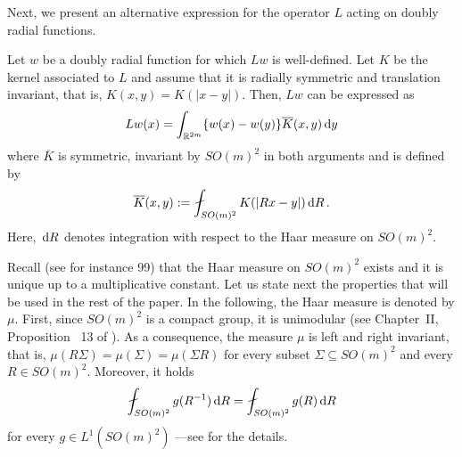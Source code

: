 Next, we present an alternative expression for the operator $L$ acting on doubly radial functions.

\begin{lemma} \label{Lemma:AlternativeOperatorExpression}
Let $w$ be a doubly radial function for which $Lw$ is well-defined. Let $K$ be the kernel
associated to $L$ and assume that it is radially symmetric and translation invariant, that is,
$K(x,y) = K(|x-y|)$. Then, $Lw$ can be expressed as
$$
Lw(x) = \int_{\mathbb{R}^{2m}} \{w(x) - w(y)\} \overline{K}(x,y) \,\mathrm{d} y
$$
where $\overline{K}$ is symmetric, invariant by $SO(m)^2$ in both arguments and is defined by
\begin{equation}
\label{Eq:KbarDef}
\overline{K}(x,y) := \average_{SO(m)^2} K(|Rx - y|)\d R\,.
\end{equation}
Here, $\,\mathrm{d} R$ denotes integration with respect to the Haar measure on $SO(m)^2$.
\end{lemma}

Recall (see for instance 99) that the Haar measure on $SO(m)^2$ exists and it is unique up to a
multiplicative constant. Let us state next the properties that will be used in the rest of the
paper. In the following, the Haar measure is denoted by $\mu$. First, since $SO(m)^2$ is a compact
group, it is unimodular (see Chapter~II, Proposition~ 13 of \cite{Nachbin}). As a consequence, the
measure $\mu$ is left and right invariant, that is, $\mu(R\Sigma) = \mu(\Sigma) = \mu(\Sigma R) $
for every subset $\Sigma \subseteq SO(m)^2$ and every $R\in SO(m)^2$. Moreover, it holds
\begin{equation}
\label{Eq:Unimodular}
\average_{SO(m)^2} g(R^{-1}) \d R = \average_{SO(m)^2} g(R) \d R
\end{equation}	
for every $g\in L^1(SO(m)^2)$ ---see \cite{Nachbin} for the details.

